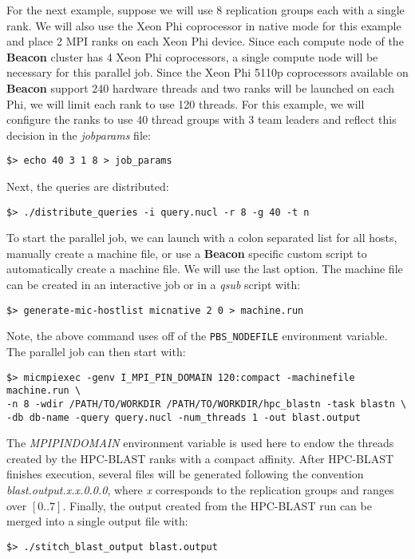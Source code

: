 \documentclass[10pt]{article}
\newcommand{\beac}{\textbf{Beacon }}
\begin{document}
For the next example, suppose we will use 8 replication groups each with a single rank.  We will also use the Xeon Phi coprocessor in native mode for this example and place 2 MPI ranks on each Xeon Phi device.  Since each compute node of the
\beac cluster has 4 Xeon Phi coprocessors, a single compute node will be necessary for this parallel job.  Since the Xeon Phi 5110p coprocessors available on \beac support
240 hardware threads and two ranks will be launched on each Phi, we will limit each rank to use 120 threads.  For this example, we will configure the ranks to use 40 thread groups with 3 team leaders and reflect this decision in the \emph{job\textunderscore params} file:
\begin{verbatim}
$> echo 40 3 1 8 > job_params
\end{verbatim}
\noindent Next, the queries are distributed:
\begin{verbatim}
$> ./distribute_queries -i query.nucl -r 8 -g 40 -t n
\end{verbatim}
\noindent To start the parallel job, we can launch with a colon separated list for all hosts, manually create a machine file, or use a \beac specific custom script to automatically create a machine file.  We will use the last option.
The machine file can be created in an interactive job or in a \emph{qsub} script with:
\begin{verbatim}
$> generate-mic-hostlist micnative 2 0 > machine.run
\end{verbatim}
\noindent Note, the above command uses off of the \verb^PBS_NODEFILE^ environment variable.  The parallel job can then start with:
\begin{verbatim}
$> micmpiexec -genv I_MPI_PIN_DOMAIN 120:compact -machinefile machine.run \
-n 8 -wdir /PATH/TO/WORKDIR /PATH/TO/WORKDIR/hpc_blastn -task blastn \
-db db-name -query query.nucl -num_threads 1 -out blast.output
\end{verbatim}
\noindent The \emph{MPI\textunderscore PIN\textunderscore DOMAIN} environment variable is used here to endow the threads created by the HPC-BLAST ranks with a compact affinity.
After HPC-BLAST finishes execution, several files will be generated following the convention \emph{blast.output.x.x.0.0.0}, where  \emph{x} corresponds to the replication groups and ranges over \([0..7]\). 
Finally, the output created from the HPC-BLAST run can be merged into a single output file with:
\begin{verbatim}
$> ./stitch_blast_output blast.output
\end{verbatim}
\end{document}
